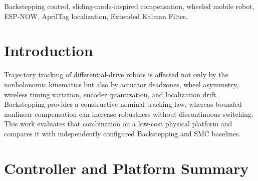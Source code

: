\documentclass[conference]{IEEEtran}
\begin{document}
\begin{abstract}
This paper presents the implementation and experimental evaluation of a
velocity-level Backstepping trajectory-tracking controller augmented with
bounded sliding-mode-inspired nonlinear compensation for a
differential-drive wheeled mobile robot. The low-cost platform combines an
STM32F411 wheel-speed controller, ESP32/ESP-NOW communication, ROS\,2
high-level control, and an overhead AprilTag camera fused with wheel odometry
through an Extended Kalman Filter. Backstepping, conventional SMC, and the
compensated controller are evaluated on circular, figure-eight, and square
references. The currently selected physical runs show comparable
Backstepping and BSMC performance on the circle and square, while the
selected pure-SMC square pilot exhibits larger corner transients. Manual
circle-displacement pilots further expose the importance of global
relocalization and inner wheel-speed behavior. Because the figure-eight,
square-SMC, and disturbance datasets are selected pilots rather than
balanced locked-gain repeats, they are reported as preliminary physical
evidence and not as final statistical validation.
\end{abstract}

\begin{IEEEkeywords}
Backstepping control, sliding-mode-inspired compensation, wheeled mobile
robot, ESP-NOW, AprilTag localization, Extended Kalman Filter.
\end{IEEEkeywords}

\section{Introduction}

Trajectory tracking of differential-drive robots is affected not only by the
nonholonomic kinematics but also by actuator deadzones, wheel asymmetry,
wireless timing variation, encoder quantization, and localization drift.
Backstepping provides a constructive nominal tracking law, whereas bounded
nonlinear compensation can increase robustness without discontinuous
switching. This work evaluates that combination on a low-cost physical
platform and compares it with independently configured Backstepping and SMC
baselines.

\section{Controller and Platform Summary}
\end{document}
